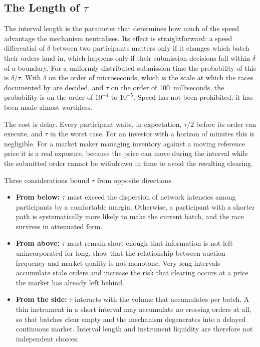 \subsection{The Length of \texorpdfstring{$\tau$}{tau}}

The interval length is the parameter that determines how much of the
speed advantage the mechanism neutralises. Its effect is
straightforward: a speed differential of $\delta$ between two
participants matters only if it changes which batch their orders land
in, which happens only if their submission decisions fall within
$\delta$ of a boundary. For a uniformly distributed submission time the
probability of this is $\delta/\tau$. With $\delta$ on the order of
microseconds, which is the scale at which the races documented by
\citet{aquilina2022quantifying} are decided, and $\tau$ on the order of
100~milliseconds, the probability is on the order of $10^{-4}$ to
$10^{-5}$. Speed has not been prohibited; it has been made almost
worthless.

The cost is delay. Every participant waits, in expectation, $\tau/2$
before its order can execute, and $\tau$ in the worst case. For an
investor with a horizon of minutes this is negligible. For a market
maker managing inventory against a moving reference price it is a real
exposure, because the price can move during the interval while the
submitted order cannot be withdrawn in time to avoid the resulting
clearing.

Three considerations bound $\tau$ from opposite directions.

\begin{itemize}
  \item \textbf{From below:} $\tau$ must exceed the dispersion of
  network latencies among participants by a comfortable margin.
  Otherwise, a participant with a shorter path is systematically more
  likely to make the current batch, and the race survives in attenuated
  form.
  \item \textbf{From above:} $\tau$ must remain short enough that
  information is not left unincorporated for long. \citet{zoican2021speed}
  show that the relationship between auction frequency and market
  quality is not monotone. Very long intervals accumulate stale orders
  and increase the risk that clearing occurs at a price the market has
  already left behind.
  \item \textbf{From the side:} $\tau$ interacts with the volume that
  accumulates per batch. A thin instrument in a short interval may
  accumulate no crossing orders at all, so that batches clear empty and
  the mechanism degenerates into a delayed continuous market. Interval
  length and instrument liquidity are therefore not independent
  choices.
\end{itemize}

